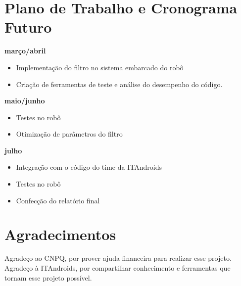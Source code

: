\documentclass[a4paper,11pt]{article}
\begin{document}
\section{Plano de Trabalho e Cronograma Futuro}
\textbf{março/abril}
\begin{itemize}
    \item Implementação do filtro no sistema embarcado do robô
    \item Criação de ferramentas de teste e análise do desempenho do código.
\end{itemize}
\textbf{maio/junho}
\begin{itemize}
    \item Testes no robô
    \item Otimização de parâmetros do filtro
\end{itemize}
\textbf{julho}
\begin{itemize}
    \item Integração com o código do time da ITAndroids
    \item Testes no robô
    \item Confecção do relatório final
\end{itemize}


\section{Agradecimentos}
Agradeço ao CNPQ, por prover ajuda financeira para realizar esse projeto. Agradeço à ITAndroids, por compartilhar conhecimento e ferramentas que tornam esse projeto possível.







%
%
%
\end{document}
